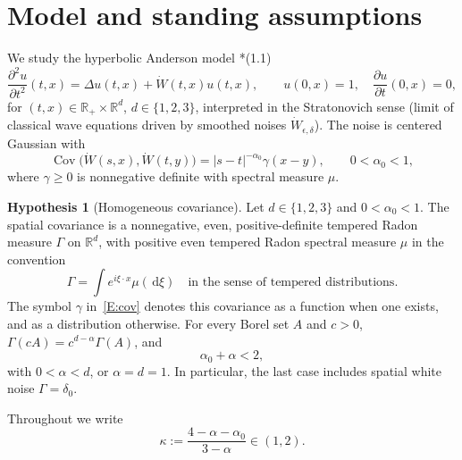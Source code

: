 \documentclass[12pt]{article}
\numberwithin{equation}{section}
\theoremstyle{definition}
\newtheorem{hypothesis}[theorem]{Hypothesis}
\newcommand{\R}{\mathbb{R}}
\newcommand{\W}{\dot W}
\newcommand{\ud}{\,\mathrm{d}}
\begin{document}
\tableofcontents

\section{Model and standing assumptions}\label{S:model}

We study the hyperbolic Anderson model
\cite{chen:author2026:time-dependency}*{(1.1)}
\begin{equation}\label{E:HAM}
  \frac{\partial^2 u}{\partial t^2}(t,x)=\Delta u(t,x)+\W(t,x)u(t,x),
  \qquad u(0,x)=1,\quad \frac{\partial u}{\partial t}(0,x)=0,
\end{equation}
for $(t,x)\in\R_+\times\R^d$, $d\in\{1,2,3\}$, interpreted in the
Stratonovich sense (limit of classical wave equations driven by smoothed
noises $\W_{\epsilon,\delta}$). The noise is centered Gaussian with
\begin{equation}\label{E:cov}
  \operatorname{Cov}\big(\W(s,x),\W(t,y)\big)=|s-t|^{-\alpha_0}\gamma(x-y),
  \qquad 0<\alpha_0<1,
\end{equation}
where $\gamma\ge0$ is nonnegative definite with spectral measure $\mu$.

\begin{hypothesis}[Homogeneous covariance]\label{H:homog}
  Let $d\in\{1,2,3\}$ and $0<\alpha_0<1$.
  The spatial covariance is a nonnegative, even, positive-definite
  tempered Radon measure $\Gamma$ on $\R^d$, with positive even
  tempered Radon spectral measure $\mu$ in the convention
  \[
    \Gamma=\int e^{i\xi\cdot x}\mu(\ud\xi)
    \quad\text{in the sense of tempered distributions}.
  \]
  The symbol $\gamma$ in~\eqref{E:cov} denotes this covariance as a
  function when one exists, and as a distribution otherwise.
  For every Borel set $A$ and $c>0$,
  $\Gamma(cA)=c^{d-\alpha}\Gamma(A)$, and
  \begin{equation}\label{E:threshold}
    \alpha_0+\alpha<2,
  \end{equation}
  with $0<\alpha<d$, or $\alpha=d=1$.
  In particular, the last case includes spatial white noise
  $\Gamma=\delta_0$.
\end{hypothesis}

Throughout we write
\begin{equation}\label{E:kappa}
  \kappa:=\frac{4-\alpha-\alpha_0}{3-\alpha}\in(1,2).
\end{equation}
\end{document}
